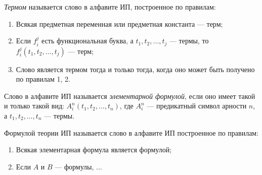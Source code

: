 \begin{definition*}
    \textit{Термом} называется слово в алфавите ИП, построенное по правилам:
    \begin{enumerate}
        \item Всякая предметная переменная или предметная константа --- терм;
        \item Если $f_i^j$ есть функциональная буква, а $t_1, t_2, \dots, t_j$ --- термы, то $f_i^j(t_1, t_2, \dots, t_j)$ --- терм;
        \item Слово является термом тогда и только тогда, когда оно может быть получено по правилам 1, 2.
    \end{enumerate}
\end{definition*}

\begin{definition*}
    Слово в алфавите ИП называется \textit{элементарной формулой}, если оно имеет такой и только такой вид: $A_i^n(t_1, t_2, \dots, t_n)$, где $A_i^n$ --- предикатный символ арности $n$, а $t_1, t_2, \dots, t_n$ --- термы.
\end{definition*}

\begin{definition*}
    Формулой теории ИП называется слово в алфавите ИП построенное по правилам:
    \begin{enumerate}
        \item Всякая элементарная формула является формулой;
        \item Если $A$ и $B$ --- формулы, ...
    \end{enumerate}
\end{definition*}